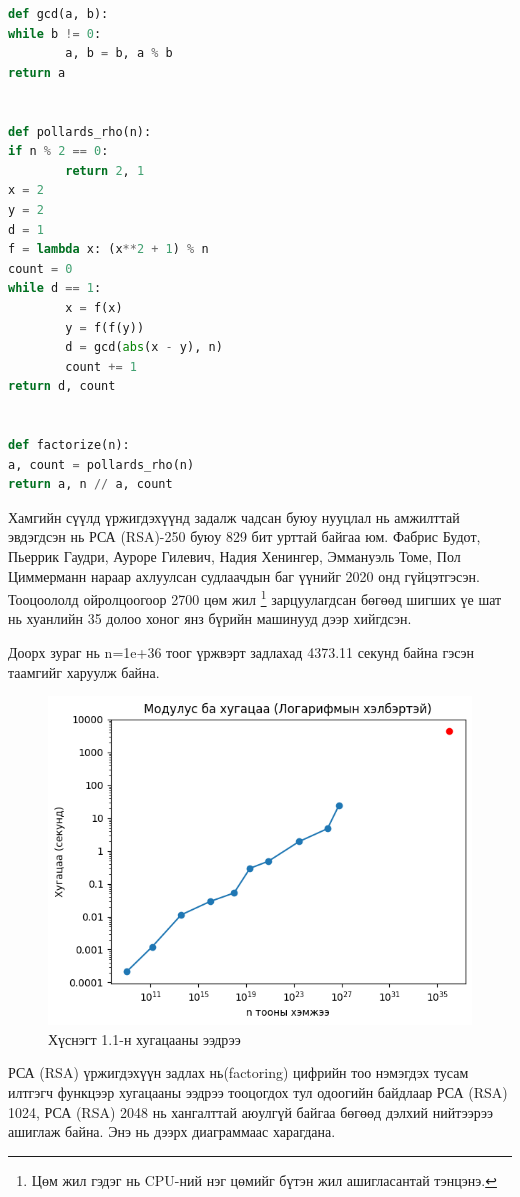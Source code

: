 \begin{lstlisting}[language=Python, caption=Поллардын ρ алгоритмын хэрэгжүүлэлт, frame=single]
def gcd(a, b):
while b != 0:
		a, b = b, a % b
return a


def pollards_rho(n):
if n % 2 == 0:
		return 2, 1
x = 2
y = 2
d = 1
f = lambda x: (x**2 + 1) % n
count = 0
while d == 1:
		x = f(x)
		y = f(f(y))
		d = gcd(abs(x - y), n)
		count += 1
return d, count


def factorize(n):
a, count = pollards_rho(n)
return a, n // a, count
\end{lstlisting}

Хамгийн сүүлд үржигдэхүүнд задалж чадсан буюу нууцлал нь амжилттай эвдэгдсэн нь РСА (RSA)-250 буюу 829 бит урттай байгаа юм. Фабрис Будот, Пьеррик Гаудри, Ауроре Гилевич, Надия Хенингер, Эммануэль Томе, Пол Циммерманн нараар ахлуулсан судлаачдын баг үүнийг 2020 онд гүйцэтгэсэн. Тооцоололд ойролцоогоор 2700 цөм жил \footnote{Цөм жил гэдэг нь CPU-ний нэг цөмийг бүтэн жил ашигласантай тэнцэнэ.} зарцуулагдсан бөгөөд шигших үе шат нь хуанлийн 35 долоо хоног янз бүрийн машинууд дээр хийгдсэн.

Доорх зураг нь n=1e+36 тоог үржвэрт задлахад 4373.11 секунд байна гэсэн таамгийг харуулж байна.

\begin{figure}[h]
	\centering
	\includegraphics[scale=0.9]{assets/rsacomplexity.png}
	\caption{Хүснэгт 1.1-н хугацааны ээдрээ}
	\label{fig:rsacomplexity}
\end{figure}

РСА (RSA) үржигдэхүүн задлах нь(factoring) цифрийн тоо нэмэгдэх тусам илтгэгч функцээр хугацааны ээдрээ тооцогдох тул одоогийн байдлаар РСА (RSA) 1024, РСА (RSA) 2048 нь хангалттай аюулгүй байгаа бөгөөд дэлхий нийтээрээ ашиглаж байна. Энэ нь дээрх диаграммаас харагдана.

